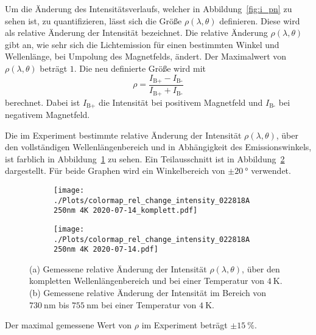 Um die Änderung des Intensitätsverlaufs, welcher in Abbildung~\ref{fig:i_pn} zu sehen ist, zu quantifizieren,
lässt sich die Größe $\rho(\lambda,\theta)$ definieren. 
Diese wird als relative Änderung der Intensität bezeichnet.
Die relative Änderung $\rho(\lambda,\theta)$ gibt an, 
wie sehr sich die Lichtemission für einen bestimmten Winkel und Wellenlänge, bei Umpolung des Magnetfelds, ändert. 
Der Maximalwert von $\rho(\lambda,\theta)$ beträgt $1$.
Die neu definierte Größe wird mit 
\begin{equation}
    \rho = \frac{I_\text{B+} - I_\text{B-} }{ I_\text{B+} + I_\text{B-} }
\end{equation}
berechnet.
Dabei ist $I_\text{B+}$ die Intensität bei positivem Magnetfeld und $I_\text{B-}$ bei negativem Magnetfeld.

Die im Experiment bestimmte relative Änderung der Intensität $\rho(\lambda,\theta)$,
über den vollständigen Wellenlängenbereich und in Abhängigkeit des Emissionswinkels,
ist farblich in Abbildung~\ref{fig:rel_komplett} zu sehen.
Ein Teilausschnitt  ist in Abbildung~\ref{fig:rel} dargestellt.
Für beide Graphen wird ein Winkelbereich von $\pm \SI{20}{\degree}$ verwendet.
\begin{figure}
    \begin{subfigure}{0.50\textwidth}
        \texttt{[image: ./Plots/colormap\_rel\_change\_intensity\_022818A 250nm 4K 2020-07-14\_komplett.pdf]}
        \caption{}
        \label{fig:rel_komplett}
    \end{subfigure}
    \begin{subfigure}{0.50\textwidth}
        \texttt{[image: ./Plots/colormap\_rel\_change\_intensity\_022818A 250nm 4K 2020-07-14.pdf]}
        \caption{}
        \label{fig:rel}
    \end{subfigure}
    \caption{(a) Gemessene relative Änderung der Intensität $\rho(\lambda,\theta)$, über den kompletten Wellenlängenbereich und 
    bei einer Temperatur von $\SI{4}{\kelvin}$. (b) Gemessene relative Änderung der Intensität im Bereich
    von $\SI{730}{\nano\meter}$ bis $\SI{755}{\nano\meter}$ bei einer Temperatur von $\SI{4}{\kelvin}$.}
    \label{fig:rho}
\end{figure}
\FloatBarrier
Der maximal gemessene Wert von $\rho$ im Experiment beträgt $\pm \SI{15}{\percent}$. 
